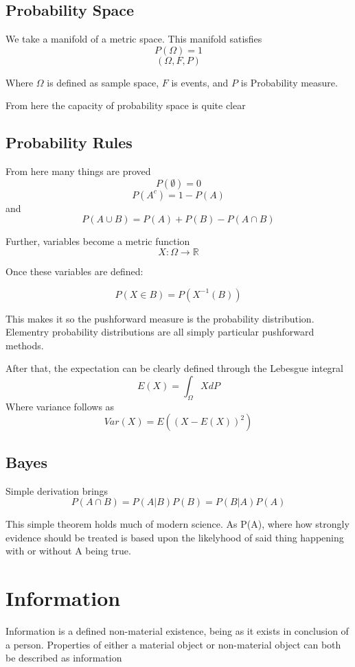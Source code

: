 \subsection{Probability Space}

We take a manifold of a metric space. This manifold satisfies
\[
P(\Omega)=1
  \]
\[
(\Omega, F, P)
  \]

  Where $ \Omega$ is defined as sample space, $F$ is events, and $P$ is Probability measure.

From here the capacity of probability space is quite clear

\subsection{Probability Rules}

From here many things are proved
\[
P(\emptyset) = 0
  \]
\[
P(A^c)=1-P(A)
\]
and
\[
P(A \cup B) = P(A) + P(B) - P(A \cap B)
  \]

  Further, variables become a metric function
\[
X: \Omega \to \mathbb{R}
  \]

  Once these variables are defined:

\[
P(X \in B)=P(X^{-1}(B))
  \]

  This makes it so the pushforward measure is the probability distribution. Elementry probability distributions are all simply particular pushforward methods.

  After that, the expectation can be clearly defined through the Lebesgue integral
\[
    E(X) = \int_\Omega X dP
  \]
  Where variance follows as
\[
Var(X)= E((X-E(X))^2)
\]

\subsection{Bayes}

Simple derivation brings
\[
P(A \cap B) = P(A | B)P(B) = P(B |A)P(A)
  \]

  This simple theorem holds much of modern science. As P(A), where how strongly evidence should be treated is based upon the likelyhood of said thing happening with or without A being true.


\section{Information}

Information is a defined non-material existence, being as it exists in conclusion of a person. Properties of either a material object or non-material object can both be described as information

